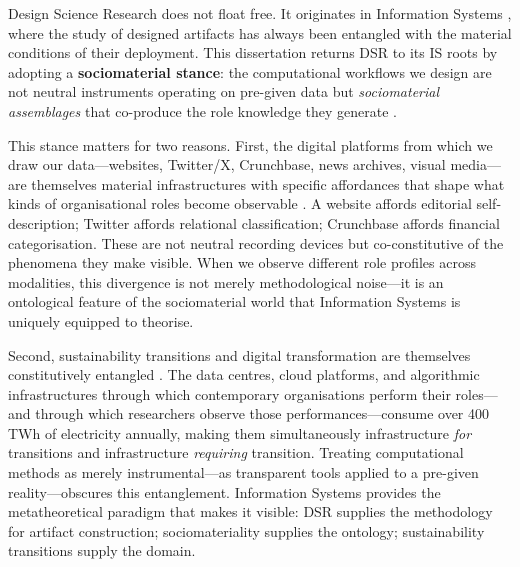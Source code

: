 \documentclass[../main.tex]{subfiles}
\begin{document}
Design Science Research does not float free. It originates in Information Systems \cite{hevner2004design,peffers2007dsr}, where the study of designed artifacts has always been entangled with the material conditions of their deployment. This dissertation returns DSR to its IS roots by adopting a \textbf{sociomaterial stance}: the computational workflows we design are not neutral instruments operating on pre-given data but \emph{sociomaterial assemblages} that co-produce the role knowledge they generate \cite{Orlikowski2007,orlikowski2008sociomateriality}.

This stance matters for two reasons. First, the digital platforms from which we draw our data---websites, Twitter/X, Crunchbase, news archives, visual media---are themselves material infrastructures with specific affordances that shape what kinds of organisational roles become observable \cite{leonardi2012materiality,kallinikos2013ambivalent}. A website affords editorial self-description; Twitter affords relational classification; Crunchbase affords financial categorisation. These are not neutral recording devices but co-constitutive of the phenomena they make visible. When we observe different role profiles across modalities, this divergence is not merely methodological noise---it is an ontological feature of the sociomaterial world that Information Systems is uniquely equipped to theorise.

Second, sustainability transitions and digital transformation are themselves constitutively entangled \cite{owoyele2025datacentering}. The data centres, cloud platforms, and algorithmic infrastructures through which contemporary organisations perform their roles---and through which researchers observe those performances---consume over 400 TWh of electricity annually, making them simultaneously infrastructure \emph{for} transitions and infrastructure \emph{requiring} transition. Treating computational methods as merely instrumental---as transparent tools applied to a pre-given reality---obscures this entanglement. Information Systems provides the metatheoretical paradigm that makes it visible: DSR supplies the methodology for artifact construction; sociomateriality supplies the ontology; sustainability transitions supply the domain.
\end{document}
